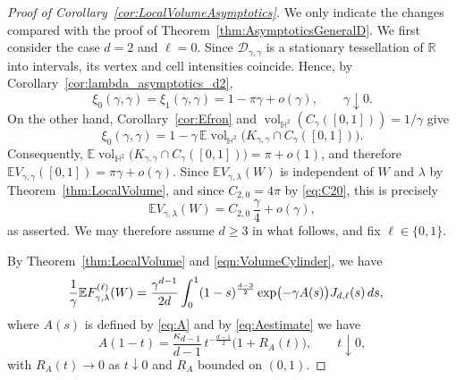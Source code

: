 \documentclass[10pt,a4paper]{amsart}
\def\EE{\mathbb{E}}
\def\HH{\mathbb{H}}
\def\RR{\mathbb{R}}
\def\cD{\mathcal{D}}
\newcommand{\dint}{\textup{d}}
\newcommand{\vol}{\mathop{\mathrm{vol}}\nolimits}
\begin{document}
\begin{proof}[Proof of Corollary~\ref{cor:LocalVolumeAsymptotics}]
	We only indicate the changes compared with the proof of
	Theorem~\ref{thm:AsymptoticsGeneralD}.
	We first consider the case \(d=2\) and \(\ell=0\). Since
	\(\cD_{\gamma,\gamma}\) is a stationary tessellation of \(\RR\) into
	intervals, its vertex and cell intensities coincide. Hence, by
	Corollary~\ref{cor:lambda_asymptotics_d2},
	\[
		\xi_0(\gamma,\gamma)
		=
		\xi_1(\gamma,\gamma)
		=
		1-\pi\gamma+o(\gamma),
		\qquad \gamma\downarrow0.
	\]
	On the other hand, Corollary~\ref{cor:Efron} and
	\(\vol_{\HH^2}(C_\gamma([0,1]))=1/\gamma\) give
	\[
		\xi_0(\gamma,\gamma)
		=
		1-\gamma\,
		\EE\vol_{\HH^2}\bigl(
		K_{\gamma,\gamma}\cap C_\gamma([0,1])
		\bigr).
	\]
	Consequently, $\EE\vol_{\HH^2}\bigl(
		K_{\gamma,\gamma}\cap C_\gamma([0,1])
		\bigr)=\pi+o(1)$,
	and therefore $\EE V_{\gamma,\gamma}([0,1])=\pi\gamma+o(\gamma)$.
	Since \(\EE V_{\gamma,\lambda}(W)\) is independent of \(W\) and
	\(\lambda\) by Theorem~\ref{thm:LocalVolume}, and since
	\(C_{2,0}=4\pi\) by \eqref{eq:C20}, this is precisely
	\[
		\EE V_{\gamma,\lambda}(W)
		=
		C_{2,0}\,
		\frac{\gamma}{4}
		+
		o(\gamma),
	\]
	as asserted. We may therefore assume \(d\ge3\) in what follows, and fix \(\ell\in\{0,1\}\).

	By Theorem~\ref{thm:LocalVolume} and
	\eqref{eqn:VolumeCylinder}, we have
	\begin{align}
		\frac{1}{\gamma}\EE F_{\gamma,\lambda}^{(\ell)}(W)
		 & =
		\frac{\gamma^{d-1}}{2d}
		\int_0^1
		(1-s)^{\frac{d-3}{2}}
		\exp\bigl(-\gamma A(s)\bigr)
		J_{d,\ell}(s)\,\dint s,
		\label{eq:LocalFunctionalAsymptotics}
	\end{align}
	where $A(s)$ is defined by \eqref{eq:A} and by  \eqref{eq:Aestimate} we have
	\[
		A(1-t)
		=
		\frac{\kappa_{d-1}}{d-1}\,
		t^{-\frac{d-1}{2}}\big(1 + R_A(t)\big),
		\qquad t\downarrow0,
	\]
	with $R_A(t) \to 0$ as $t \downarrow 0$ and $R_A$ bounded on $(0,1)$.


\end{proof}
\end{document}
